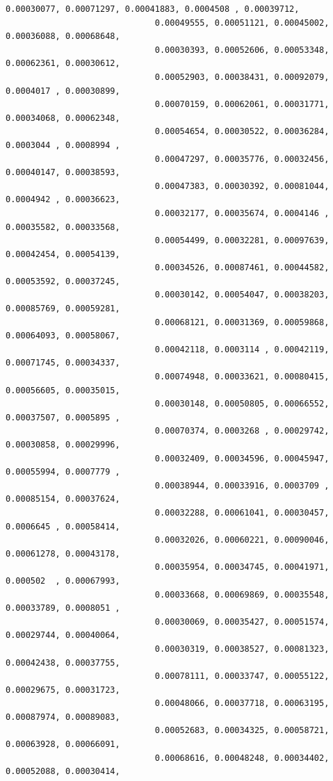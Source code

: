 \documentclass[11pt]{article}
\begin{document}
\begin{Verbatim}[commandchars=\\\{\}]
                              0.00030077, 0.00071297, 0.00041883, 0.0004508 , 0.00039712,
                              0.00049555, 0.00051121, 0.00045002, 0.00036088, 0.00068648,
                              0.00030393, 0.00052606, 0.00053348, 0.00062361, 0.00030612,
                              0.00052903, 0.00038431, 0.00092079, 0.0004017 , 0.00030899,
                              0.00070159, 0.00062061, 0.00031771, 0.00034068, 0.00062348,
                              0.00054654, 0.00030522, 0.00036284, 0.0003044 , 0.0008994 ,
                              0.00047297, 0.00035776, 0.00032456, 0.00040147, 0.00038593,
                              0.00047383, 0.00030392, 0.00081044, 0.0004942 , 0.00036623,
                              0.00032177, 0.00035674, 0.0004146 , 0.00035582, 0.00033568,
                              0.00054499, 0.00032281, 0.00097639, 0.00042454, 0.00054139,
                              0.00034526, 0.00087461, 0.00044582, 0.00053592, 0.00037245,
                              0.00030142, 0.00054047, 0.00038203, 0.00085769, 0.00059281,
                              0.00068121, 0.00031369, 0.00059868, 0.00064093, 0.00058067,
                              0.00042118, 0.0003114 , 0.00042119, 0.00071745, 0.00034337,
                              0.00074948, 0.00033621, 0.00080415, 0.00056605, 0.00035015,
                              0.00030148, 0.00050805, 0.00066552, 0.00037507, 0.0005895 ,
                              0.00070374, 0.0003268 , 0.00029742, 0.00030858, 0.00029996,
                              0.00032409, 0.00034596, 0.00045947, 0.00055994, 0.0007779 ,
                              0.00038944, 0.00033916, 0.0003709 , 0.00085154, 0.00037624,
                              0.00032288, 0.00061041, 0.00030457, 0.0006645 , 0.00058414,
                              0.00032026, 0.00060221, 0.00090046, 0.00061278, 0.00043178,
                              0.00035954, 0.00034745, 0.00041971, 0.000502  , 0.00067993,
                              0.00033668, 0.00069869, 0.00035548, 0.00033789, 0.0008051 ,
                              0.00030069, 0.00035427, 0.00051574, 0.00029744, 0.00040064,
                              0.00030319, 0.00038527, 0.00081323, 0.00042438, 0.00037755,
                              0.00078111, 0.00033747, 0.00055122, 0.00029675, 0.00031723,
                              0.00048066, 0.00037718, 0.00063195, 0.00087974, 0.00089083,
                              0.00052683, 0.00034325, 0.00058721, 0.00063928, 0.00066091,
                              0.00068616, 0.00048248, 0.00034402, 0.00052088, 0.00030414,

\end{Verbatim}
\end{document}
